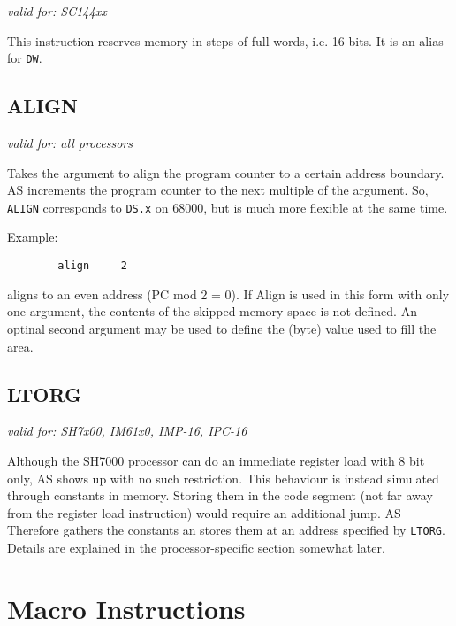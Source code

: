 \documentclass[12pt,twoside]{report}
\makeatletter
\newcommand{\tty}[1]{{\tt #1}}
\newcommand{\ttindex}[1]{\index{#1@{\tt #1}}}
\newcommand{\asname}{{AS}}
\makeatother
\begin{document}
{\em valid for: SC144xx}

This instruction reserves memory in steps of full words, i.e. 16 bits.  It
is an alias for {\tt DW}.


\subsection{ALIGN}
\ttindex{ALIGN}

{\em valid for: all processors}

Takes the argument to align the program counter to a certain address
boundary.  \asname{} increments the program counter to the next multiple of the
argument.  So, \tty{ALIGN} corresponds to \tty{DS.x} on 68000, but is much
more flexible at the same time.

Example:
\begin{verbatim}
        align     2
\end{verbatim}
aligns to an even address (PC mod 2 = 0).  If Align is used in this form with
only one argument, the contents of the skipped memory space is not defined. 
An optinal second argument may be used to define the (byte) value
used to fill the area.


\subsection{LTORG}
\ttindex{LTORG}

{\em valid for: SH7x00, IM61x0, IMP-16, IPC-16}

Although the SH7000 processor can do an immediate register load with
8 bit only, \asname{} shows up with no such restriction.  This behaviour is
instead simulated through constants in memory.  Storing them in
the code segment (not far away from the register load instruction)
would require an additional jump.  \asname{} Therefore gathers the constants
an stores them at an address specified by \tty{LTORG}.  Details are
explained in the processor-specific section somewhat later.


\section{Macro Instructions}
\end{document}
